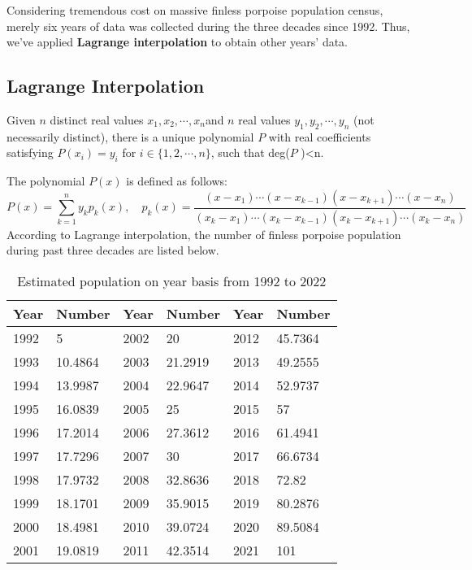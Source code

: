 \documentclass{mcmthesis}
\numberwithin{figure}{section}
\numberwithin{table}{section}
\numberwithin{equation}{section}
\begin{document}
Considering tremendous cost on massive finless porpoise population 
census, merely six years of data was collected during the three decades since 1992.
Thus, we've applied \textbf{Lagrange interpolation} to obtain other years' data.

\subsection{Lagrange Interpolation}
Given $ n $ distinct real values $ x_1, x_2, \cdots , x_n $and $ n $
real values $ y_1, y_2,\cdots, y_n $ (not necessarily distinct), there
is a unique polynomial $ P $ with real coefficients satisfying 
$ P(x_i)= y_i $ for $ i \in \{1,2,\cdots,n\} $, such that deg($ P $ )<n.
\par
The polynomial $ P(x) $ is defined as follows:   
$$
  P(x) = \sum \limits _{k = 1}^ny_kp_k(x),\quad
  p_k(x) = \frac{(x-x_1)\cdots (x-x_{k-1})(x-x_{k+1})\cdots (x-x_n)}{
    (x_k-x_1)\cdots (x_k-x_{k-1})(x_k-x_{k+1})\cdots (x_k-x_n)
  }
$$ 
According to Lagrange interpolation, the number of finless porpoise population 
during past three decades are listed below.
\begin{table}[htpb!]
  \centering
  \caption{Estimated population on year basis from 1992 to 2022} \label{Lagrange table}
  \begin{tabular}{m{2cm}<{\centering}|m{2cm}<{\centering}|m{2cm}<{\centering}|m{2cm}<{\centering}|m{2cm}<{\centering}|m{2cm}<{\centering}}
    \textbf{Year}&\textbf{Number}&\textbf{Year}&\textbf{Number}&\textbf{Year}&\textbf{Number}\\ \hline
    1992 & 5       & 2002 & 20      & 2012 & 45.7364 \\
    1993 & 10.4864 & 2003 & 21.2919 & 2013 & 49.2555 \\
    1994 & 13.9987 & 2004 & 22.9647 & 2014 & 52.9737 \\
    1995 & 16.0839 & 2005 & 25      & 2015 & 57      \\
    1996 & 17.2014 & 2006 & 27.3612 & 2016 & 61.4941 \\
    1997 & 17.7296 & 2007 & 30      & 2017 & 66.6734 \\
    1998 & 17.9732 & 2008 & 32.8636 & 2018 & 72.82   \\
    1999 & 18.1701 & 2009 & 35.9015 & 2019 & 80.2876 \\
    2000 & 18.4981 & 2010 & 39.0724 & 2020 & 89.5084 \\
    2001 & 19.0819 & 2011 & 42.3514 & 2021 & 101     \\
  \end{tabular}
\end{table}
\end{document}
